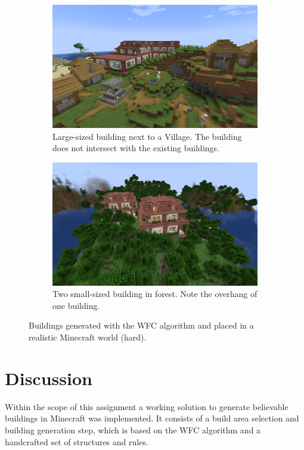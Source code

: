 \documentclass[
oneside,
fontsize=11pt
]{scrartcl}
\begin{document}
\begin{figure}[ht]
  \centering
  \begin{subfigure}[t]{0.48\textwidth}
    \includegraphics[width=\textwidth]{images/end2end/generated_large_building_next_to_village.png}
    \caption{Large-sized building next to a Village. The building does not intersect with the existing buildings.}
  \end{subfigure}
  \hfill
  \begin{subfigure}[t]{0.48\textwidth}
    \includegraphics[width=\textwidth]{images/end2end/generated_double_house_overhang.png}
    \caption{Two small-sized building in forest. Note the overhang of one building.}
  \end{subfigure}
  \caption{Buildings generated with the WFC algorithm and placed in a realistic Minecraft world (hard).}
  \label{fig_generated_medium_building_real_world_difficult}
\end{figure}

\newpage
\section{Discussion}
Within the scope of this assignment a working solution 
to generate believable buildings in Minecraft was implemented.
It consists of a build area selection and building generation step, 
which is based on the WFC algorithm and a handcrafted set of structures and rules.
\end{document}
